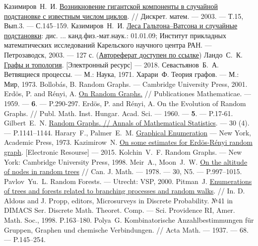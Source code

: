\begin{thebibliography}{199}
 Казимиров~Н.~И. \href{http://www.mathnet.ru/links/16a8a95d8309a4912790e5ee8a71e614/dm212.pdf}{Возникновение гигантской компоненты в случайной подстановке с известным числом циклов}. // Дискрет. матем. --- 2003. --- Т.15, Вып.3. --- С.145–159.
 Казимиров~Н.~И. \href{https://dlib.rsl.ru/01002618702}{Леса Гальтона--Ватсона и случайные подстановки}: дис. ... канд.физ.-мат.наук.: 01.01.09; Институт прикладных математических исследований Карельского научного центра РАН. --- Петрозаводск, 2003. --- 127 с.  (\href{https://dlib.rsl.ru/01002656449}{Автореферат доступен по ссылке})
 Ландо~С.~К. \href{https://electives.hse.ru/data/2018/06/01/1150198748/GraphTopology18.pdf}{Графы и топология}. [Электронный ресурс] --- 2018.
 Севастьянов~Б.~А. Ветвящиеся процессы. --- М.: Наука, 1971.
 Харари~Ф. Теория графов. --- М.: Мир, 1973.
 Bollob\'as, B. Random Graphs. --- Cambridge University Press, 2001.
 Erd\"os, P. and R\'enyi, A. \href{https://www.renyi.hu/~p_erdos/1959-11.pdf}{On Random Graphs.} // Publicationes Mathematicae. --- 1959. --- {\bfseries 6}. --- P.290-297.
 Erd\"os, P. and R\'enyi, A. On the Evolution of Random Graphs. // Publ. Math. Inst. Hungar. Acad. Sci. --- 1960. --- {\bfseries 5}. --- P.17-61.
 Gilbert~E.~N. \href{https://projecteuclid.org/euclid.aoms/1177706098}{Random Graphs. // Annals of Mathematical Statistics}. --- 30 (4). --- P.1141--1144.
 Harary~F., Palmer~E.~M. \href{https://books.google.ru/books?hl=en&lr=&id=ZrvSBQAAQBAJ&oi=fnd&pg=PP1&ots=jBntDVBl4d&sig=NKBI28Bg6pjKqLwW3QUcrw7wuZ0&redir_esc=y#v=onepage&q&f=false}{Graphical Enumeration} --- New York, Academic Press, 1973.
 Kazimirow~N. \href{https://arxiv.org/pdf/1904.01263.pdf}{On some estimates for Erd\"os-R\'enyi random graph}. [Electronic Resourse] --- 2015.
 Kolchin~V.~F. Random Graphs. --- New York: Cambridge University Press, 1998.
 Meir~A., Moon~J.~W. \href{https://doi.org/10.4153/CJM-1978-085-0}{On the altitude of nodes in random trees} // Can. J. Math. --- 1978. --- 30, N5. --- P.997–1015.
 Pavlov~Yu.~L. Random Forests. --- Utrecht: VSP, 2000.
 Pitman~J. \href{https://statistics.berkeley.edu/tech-reports/482}{Enumerations of trees and forests related to branching processes and random walks}. // In. D. Aldous and J. Propp, editors, Microsurveys in
Discrete Probability. №41 in DIMACS Ser. Discrete Math. Theoret. Comp.
--- Sci. Providence RI, Amer. Math. Soc., 1998. P.163–180.
 Polya~G. Kombinatorische Anzahlbestimmungen f\"ur Gruppen, Graphen und chemische Verbindungen. // Acta Math. --- 1937. --- 68. --- P.145--254.
\end{thebibliography}

